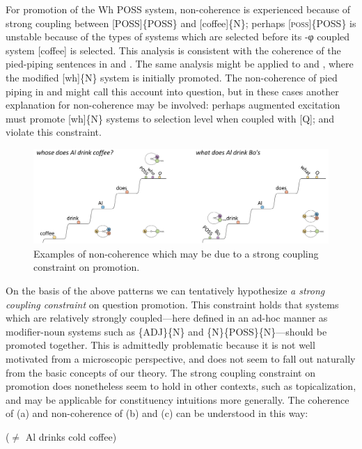 For promotion of the {\textbar}Wh POSS{\textbar} system, non-coherence is experienced because of strong coupling between [POSS]\{POSS\} and [coffee]\{N\}; perhaps [\textsc{poss}]\{POSS\} is unstable because of the types of systems which are selected before its -φ coupled system [coffee] is selected. This analysis is consistent with the coherence of the pied-piping sentences in  and . The same analysis might be applied to  and , where the modified [wh]\{N\} system is initially promoted. The non-coherence of pied piping in  and  might call this account into question, but in these cases another explanation for non-coherence may be involved: perhaps augmented excitation must promote [wh]\{N\} systems to selection level when coupled with [Q];  and  violate this constraint. 

  
\begin{figure}
\includegraphics[width=\textwidth]{figures/Tilsen-img166.png}
\caption{Examples of non-coherence which may be due to a strong coupling constraint on promotion.}
\label{fig:7:22}
\end{figure}
 

  On the basis of the above patterns we can tentatively hypothesize \textit{a strong coupling constraint} on question promotion. This constraint holds that systems which are relatively strongly coupled—here defined in an ad-hoc manner as modifier-noun systems such as \{ADJ\}\{N\} and \{N\}\{POSS\}\{N\}—should be promoted together. This is admittedly problematic because it is not well motivated from a microscopic perspective, and does not seem to fall out naturally from the basic concepts of our theory. The strong coupling constraint on promotion does nonetheless seem to hold in other contexts, such as topicalization, and may be applicable for constituency intuitions more generally. The coherence of (a) and non-coherence of (b) and (c) can be understood in this way:

  \ea
    (${\neq}$ Al drinks cold coffee)
  \z
  \z
  
